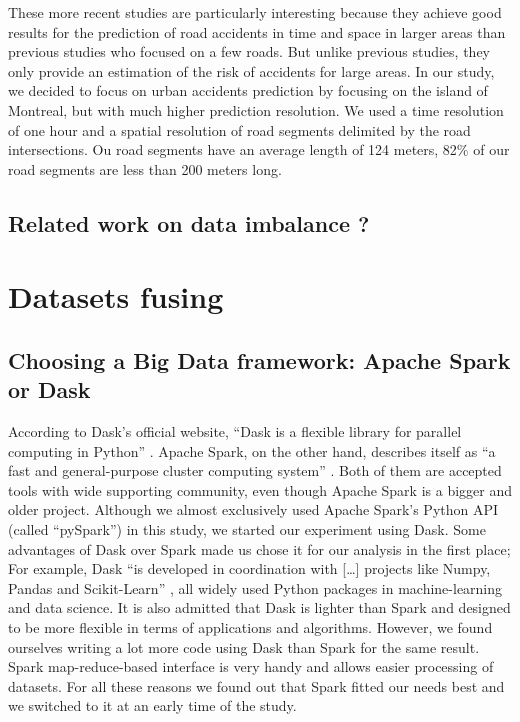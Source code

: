 \documentclass[conference]{IEEEtran}
\begin{document}
These more recent studies are particularly interesting because they achieve good results for the prediction of road accidents in time and space in larger areas than previous studies who focused on a few roads. But unlike previous studies, they only provide an estimation of the risk of accidents for large areas. In our study, we decided to focus on urban accidents prediction by focusing on the island of Montreal, but with much higher prediction resolution. We used a time resolution of one hour and a spatial resolution of road segments delimited by the road intersections. Ou road segments have an average length of 124 meters, 82\% of our road segments are less than 200 meters long.

\subsection{Related work on data imbalance ?}

\section{Datasets fusing}
\subsection{Choosing a Big Data framework: Apache Spark or Dask}
According to Dask’s official website, “Dask is a flexible library for parallel computing in Python” \cite{dask}.
Apache Spark, on the other hand, describes itself as “a fast and general-purpose cluster computing system” \cite{spark}.
Both of them are accepted tools with wide supporting community, even though Apache Spark is a bigger and older project.
Although we almost exclusively used Apache Spark’s Python API (called “pySpark”) in this study, we started our experiment using Dask.
Some advantages of Dask over Spark made us chose it for our analysis in the first place; For example, Dask “is developed in coordination with […] projects like Numpy, Pandas and Scikit-Learn” \cite{dask}, all widely used Python packages in machine-learning and data science.
It is also admitted that Dask is lighter than Spark and designed to be more flexible in terms of applications and algorithms.
However, we found ourselves writing a lot more code using Dask than Spark for the same result.
Spark map-reduce-based interface is very handy and allows easier processing of datasets.
For all these reasons we found out that Spark fitted our needs best and we switched to it at an early time of the study.
\end{document}
